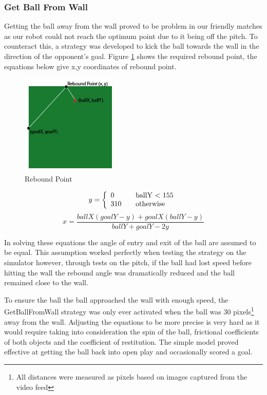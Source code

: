 \subsubsection{Get Ball From Wall}
Getting the ball away from the wall proved to be problem in our friendly matches as our robot could not reach the optimum point due to it being off the pitch. To counteract this, a strategy was developed to kick the ball towards the wall in the direction of the opponent's goal. Figure \ref{fig:rebound} shows the required rebound point, the equations below give x,y coordinates of rebound point.

\begin{figure}[htp]
\begin{center}
\leavevmode
\includegraphics[width=0.4\textwidth] {images/rebound.jpg}
\end{center}
\caption{Rebound Point}
\label{fig:rebound}
\end{figure}

\[y = \left\{ 
\begin{array}{l l}
  0 & \quad \mbox{ballY $<$ 155}\\
  310 & \quad \mbox{otherwise}\\ \end{array} \right. \]
\[x = \frac{ballX(goalY-y) + goalX(ballY-y)}{ballY + goalY - 2y} \]

In solving these equations the angle of entry and exit of the ball are assumed to be equal. This assumption worked perfectly when testing the strategy on the simulator however, through tests on the pitch, if the ball had lost speed before hitting the wall the rebound angle was dramatically reduced and the ball remained close to the wall. 

To ensure the ball the ball approached the wall with enough speed, the GetBallFromWall strategy was only ever activated when the ball was 30 pixels\footnote{All distances were measured as pixels based on images captured from the video feed} away from the wall. Adjusting the equations to be more precise is very hard as it would require taking into consideration the spin of the ball, frictional coefficients of both objects and the coefficient of restitution. The simple model proved effective at getting the ball back into open play and occasionally scored a goal.\linebreak

